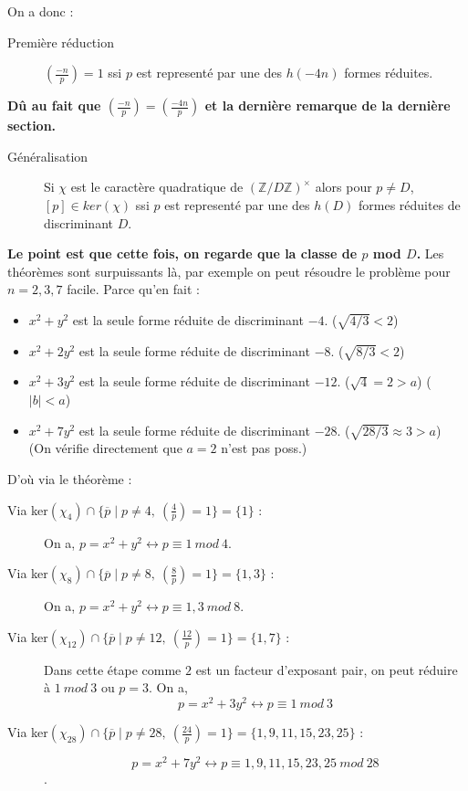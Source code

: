 \documentclass[12pt]{article}
\theoremstyle{plain}
\newcommand{\Z}{\mathbb{Z}}
\newcommand{\rg}{\color{Red}}
\begin{document}
On a donc :
\begin{description}
    \item[\rg Première réduction] $\left(\frac{-n}{p}\right)=1$ ssi $p$ est representé par une des $h(-4n)$ formes réduites.
\end{description}

\textbf{Dû au fait que $\left(\frac{-n}{p}\right)=\left(\frac{-4n}{p}\right)$ et la dernière remarque de la dernière section.}

\begin{description}
    \item[\rg Généralisation] Si $\chi$ est le caractère quadratique de $(\Z/D\Z)^{\times}$ alors pour $p\ne D$, $[p]\in ker(\chi)$ ssi $p$ est 
representé par une des $h(D)$ formes réduites de discriminant $D$.
\end{description}

\textbf{Le point est que cette fois, on regarde que la classe de $p$ mod $D$.}
Les théorèmes sont surpuissants là, par exemple on peut résoudre le problème pour $n=2,3,7$ facile. Parce qu'en fait :
\begin{itemize}
    \item $x^2+y^2$ est la seule forme réduite de discriminant $-4$. ($\sqrt{4/3}<2$)
    \item $x^2+2y^2$ est la seule forme réduite de discriminant $-8$. ($\sqrt{8/3}<2$)
    \item $x^2+3y^2$ est la seule forme réduite de discriminant $-12$. ($\sqrt{4}=2> a$) ($\mid b\mid < a$)
    \item $x^2+7y^2$ est la seule forme réduite de discriminant $-28$. ($\sqrt{28/3}\approx 3 > a$) (On vérifie directement que $a=2$ n'est pas poss.) 
\end{itemize}

D'où via le théorème : 
\begin{description}
    \item[Via ker$(\chi_4)\cap\{\overline{p}\mid p\ne 4,~\left(\frac{4}{p}\right)=1\}=\{1\}$ :] On a, $p=x^2+y^2\leftrightarrow p\equiv 1~mod~4$.
    \item[Via ker$(\chi_8)\cap\{\overline{p}\mid p\ne 8,~\left(\frac{8}{p}\right)=1\}=\{1, 3\}$ :] On a, $p=x^2+y^2\leftrightarrow p\equiv 1,3~mod~8$.
    \item[Via ker$(\chi_{12})\cap\{\overline{p}\mid p\ne 12,~\left(\frac{12}{p}\right)=1\}=\{1, 7\}$ :] Dans cette étape comme $2$ est un facteur d'exposant pair, on peut réduire à $1~mod~3$ ou $p=3$. On a, $$p=x^2+3y^2\leftrightarrow p\equiv 1~mod~3$$
    \item[Via ker$(\chi_{28})\cap\{\overline{p}\mid p\ne 28,~\left(\frac{24}{p}\right)=1\}=\{1,9,11,15,23,25\}$ :] $$p=x^2+7y^2\leftrightarrow p\equiv 1,9,11,15,23,25~mod~28$$.
\end{description}
\end{document}
